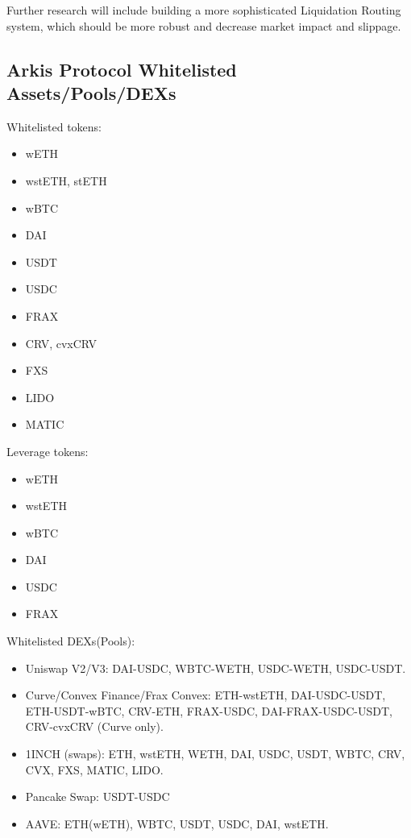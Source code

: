 \documentclass[conference]{IEEEtran}
\begin{document}
Further research will include building a more sophisticated Liquidation Routing system, which should be more robust and decrease market impact and slippage.






\newpage

\begin{appendices}
\section{Arkis Protocol Whitelisted Assets/Pools/DEXs}
Whitelisted tokens:
\begin{itemize}
	\item wETH
	\item wstETH, stETH
	\item wBTC
	\item DAI
	\item USDT
	\item USDC
	\item FRAX
	\item CRV, cvxCRV
	\item FXS
	\item LIDO
	\item MATIC
\end{itemize}
Leverage tokens: 
\begin{itemize}
	\item wETH
	\item wstETH
	\item wBTC
	\item DAI
	\item USDC
	\item FRAX
\end{itemize}
Whitelisted DEXs(Pools):
\begin{itemize}
	\item Uniswap V2/V3: DAI-USDC, WBTC-WETH, USDC-WETH, USDC-USDT.
	\item Curve/Convex Finance/Frax Convex: ETH-wstETH, DAI-USDC-USDT, ETH-USDT-wBTC, CRV-ETH, FRAX-USDC, DAI-FRAX-USDC-USDT, CRV-cvxCRV (Curve only).
	\item 1INCH (swaps): ETH, wstETH, WETH, DAI, USDC, USDT, WBTC, CRV, CVX, FXS, MATIC, LIDO.
	\item Pancake Swap: USDT-USDC
	\item AAVE: ETH(wETH), WBTC, USDT, USDC, DAI, wstETH.
\end{itemize}




\end{appendices}
\end{document}

